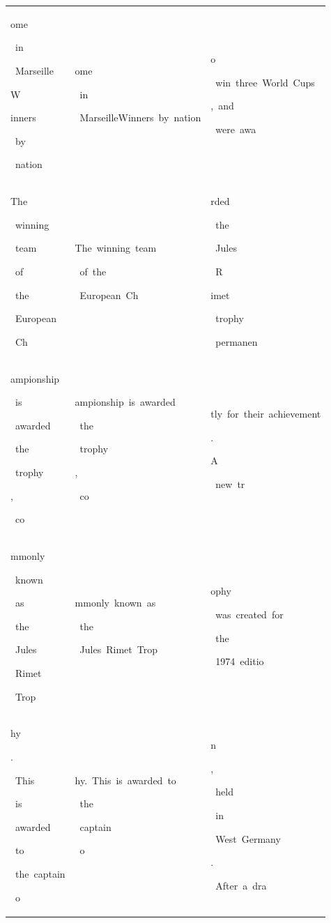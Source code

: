\begin{table}[h]
\begin{tabular}{ l | l | l }
 \colorbox{cm_32!40}{\strut ome}\colorbox{cm_37!40}{\strut \ in}\colorbox{cm_32!40}{\strut \ Marseille}\colorbox{cm_22!40}{\strut }\colorbox{cm_39!40}{\strut }\colorbox{cm_22!40}{\strut W}\colorbox{cm_21!40}{\strut inners}\colorbox{cm_30!40}{\strut \ by}\colorbox{cm_40!40}{\strut \ nation}\colorbox{cm_42!40}{\strut } & \colorbox{cm_0!40}{\strut ome}\colorbox{cm_12!40}{\strut \ in}\colorbox{cm_0!40}{\strut \ MarseilleWinners\ by\ nation} & \colorbox{cm_12!40}{\strut o}\colorbox{cm_0!40}{\strut \ win\ three\ World\ Cups}\colorbox{cm_12!40}{\strut ,\ and}\colorbox{cm_0!40}{\strut \ were\ awa} \\ 
 \colorbox{cm_30!40}{\strut }\colorbox{cm_46!40}{\strut The}\colorbox{cm_18!40}{\strut \ winning}\colorbox{cm_27!40}{\strut \ team}\colorbox{cm_21!40}{\strut \ of}\colorbox{cm_30!40}{\strut \ the}\colorbox{cm_60!40}{\strut \ European}\colorbox{cm_35!40}{\strut \ Ch} & \colorbox{cm_0!40}{\strut The\ winning\ team}\colorbox{cm_12!40}{\strut \ of\ the}\colorbox{cm_0!40}{\strut \ European\ Ch} & \colorbox{cm_0!40}{\strut rded}\colorbox{cm_12!40}{\strut \ the}\colorbox{cm_25!40}{\strut \ Jules}\colorbox{cm_38!40}{\strut \ R}\colorbox{cm_51!40}{\strut imet}\colorbox{cm_12!40}{\strut \ trophy}\colorbox{cm_0!40}{\strut \ permanen} \\ 
 \colorbox{cm_35!40}{\strut ampionship}\colorbox{cm_29!40}{\strut \ is}\colorbox{cm_51!40}{\strut \ awarded}\colorbox{cm_29!40}{\strut \ the}\colorbox{cm_8!40}{\strut \ trophy}\colorbox{cm_22!40}{\strut ,}\colorbox{cm_27!40}{\strut \ co} & \colorbox{cm_0!40}{\strut ampionship\ is\ awarded}\colorbox{cm_12!40}{\strut \ the}\colorbox{cm_0!40}{\strut \ trophy}\colorbox{cm_12!40}{\strut ,}\colorbox{cm_0!40}{\strut \ co} & \colorbox{cm_0!40}{\strut tly\ for\ their\ achievement}\colorbox{cm_12!40}{\strut .}\colorbox{cm_0!40}{\strut A}\colorbox{cm_12!40}{\strut \ new\ tr} \\ 
 \colorbox{cm_27!40}{\strut mmonly}\colorbox{cm_31!40}{\strut \ known}\colorbox{cm_32!40}{\strut \ as}\colorbox{cm_31!40}{\strut \ the}\colorbox{cm_51!40}{\strut \ Jules}\colorbox{cm_32!40}{\strut \ Rimet}\colorbox{cm_44!40}{\strut \ Trop} & \colorbox{cm_0!40}{\strut mmonly\ known\ as}\colorbox{cm_12!40}{\strut \ the}\colorbox{cm_0!40}{\strut \ Jules\ Rimet\ Trop} & \colorbox{cm_12!40}{\strut ophy}\colorbox{cm_0!40}{\strut \ was\ created\ for}\colorbox{cm_12!40}{\strut \ the}\colorbox{cm_0!40}{\strut \ 1974\ editio} \\ 
 \colorbox{cm_44!40}{\strut hy}\colorbox{cm_32!40}{\strut .}\colorbox{cm_0!40}{\strut \ This}\colorbox{cm_42!40}{\strut \ is}\colorbox{cm_18!40}{\strut \ awarded}\colorbox{cm_34!40}{\strut \ to}\colorbox{cm_31!40}{\strut \ the\ captain}\colorbox{cm_33!40}{\strut \ o} & \colorbox{cm_0!40}{\strut hy.\ This\ is\ awarded\ to}\colorbox{cm_12!40}{\strut \ the}\colorbox{cm_0!40}{\strut \ captain}\colorbox{cm_12!40}{\strut \ o} & \colorbox{cm_0!40}{\strut n}\colorbox{cm_12!40}{\strut ,}\colorbox{cm_0!40}{\strut \ held}\colorbox{cm_12!40}{\strut \ in}\colorbox{cm_0!40}{\strut \ West\ Germany}\colorbox{cm_12!40}{\strut .}\colorbox{cm_0!40}{\strut \ After\ a\ dra} \\ 

\end{tabular}
\end{table}
